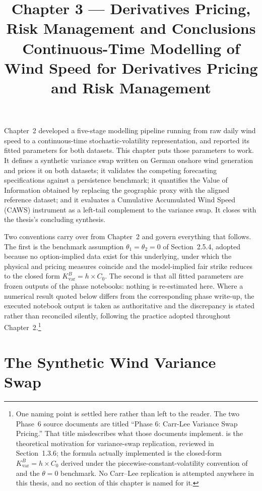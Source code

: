 \documentclass[11pt, a4paper, twoside]{article}
\title{\textbf{Chapter 3 --- Derivatives Pricing, Risk Management and Conclusions}\\[4pt]
\large Continuous-Time Modelling of Wind Speed for Derivatives Pricing and Risk Management}
\author{}
\date{}
\begin{document}
\maketitle

Chapter~2 developed a five-stage modelling pipeline running from raw daily wind speed to a continuous-time stochastic-volatility representation, and reported its fitted parameters for both datasets. This chapter puts those parameters to work. It defines a synthetic variance swap written on German onshore wind generation and prices it on both datasets; it validates the competing forecasting specifications against a persistence benchmark; it quantifies the Value of Information obtained by replacing the geographic proxy with the aligned reference dataset; and it evaluates a Cumulative Accumulated Wind Speed (CAWS) instrument as a left-tail complement to the variance swap. It closes with the thesis's concluding synthesis.

Two conventions carry over from Chapter~2 and govern everything that follows. The first is the benchmark assumption $\theta_1 = \theta_2 = 0$ of Section~2.5.4, adopted because no option-implied data exist for this underlying, under which the physical and pricing measures coincide and the model-implied fair strike reduces to the closed form $K_{\text{var}}^B = h \times C_0$. The second is that all fitted parameters are frozen outputs of the phase notebooks: nothing is re-estimated here. Where a numerical result quoted below differs from the corresponding phase write-up, the executed notebook output is taken as authoritative and the discrepancy is stated rather than reconciled silently, following the practice adopted throughout Chapter~2.\footnote{One naming point is settled here rather than left to the reader. The two Phase~6 source documents are titled ``Phase 6: Carr-Lee Variance Swap Pricing.'' That title misdescribes what those documents implement. \citet{CarrLee2009} is the theoretical motivation for variance-swap replication, reviewed in Section~1.3.6; the formula actually implemented is the closed-form $K_{\text{var}}^B = h \times C_0$ derived under the piecewise-constant-volatility convention of \citet{Tol1997} and the $\theta = 0$ benchmark. No Carr--Lee replication is attempted anywhere in this thesis, and no section of this chapter is named for it.}

\section{The Synthetic Wind Variance Swap}
\label{sec:varswap}
\end{document}
